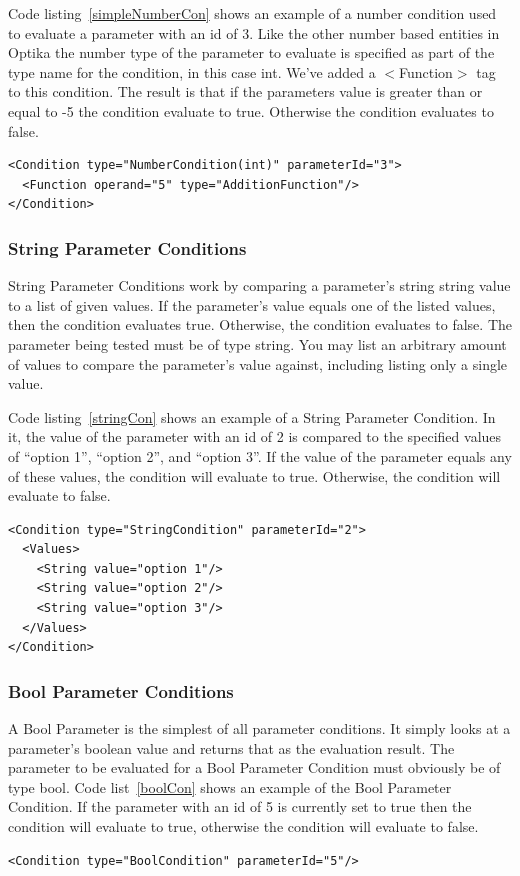 Code listing~\ref{simpleNumberCon} shows an example of a number condition used to evaluate a parameter with an id of 3. Like the other number based entities in Optika the number 
type of the parameter to evaluate is specified as part of the type name for the condition, in this case int. We've added a $<$Function$>$ tag to this condition. The result is 
that if the parameters value is greater than or equal to -5 the condition evaluate to true. Otherwise the condition evaluates to false.
\begin{lstlisting}[caption={Example of a Number Parameter Condition}, label=simpleNumberCon]
<Condition type="NumberCondition(int)" parameterId="3">
  <Function operand="5" type="AdditionFunction"/>
</Condition>
\end{lstlisting}

\subsubsection{String Parameter Conditions}
String Parameter Conditions work by comparing a parameter's string string value to a list of given values. If the parameter's value equals one of the listed values, then the
condition evaluates true. Otherwise, the condition evaluates to false. The parameter being tested must be of type string. You may list an arbitrary amount of values to 
compare the parameter's value against, including listing only a single value.

Code listing~\ref{stringCon} shows an example of a String Parameter Condition. In it, the value of the parameter with an id of 2 is compared to the specified values of
``option 1'', ``option 2'', and ``option 3''. If the value of the parameter equals any of these values, the condition will evaluate to true. Otherwise, the condition will
evaluate to false.
\begin{lstlisting}[caption={Example of a String Parameter Condition}, label=stringCon]
<Condition type="StringCondition" parameterId="2">
  <Values>
    <String value="option 1"/> 
    <String value="option 2"/> 
    <String value="option 3"/> 
  </Values>
</Condition>
\end{lstlisting}

\subsubsection{Bool Parameter Conditions}
A Bool Parameter is the simplest of all parameter conditions. It simply looks at a parameter's boolean value and returns that as the evaluation result. The parameter to be
evaluated for a Bool Parameter Condition must obviously be of type bool. Code list~\ref{boolCon} shows an example of the Bool Parameter Condition. If the parameter with an id
of 5 is currently set to true then the condition will evaluate to true, otherwise the condition will evaluate to false.
\begin{lstlisting}[caption={Example of a Bool Parameter Condition}, label=boolCon]
<Condition type="BoolCondition" parameterId="5"/>
\end{lstlisting}

